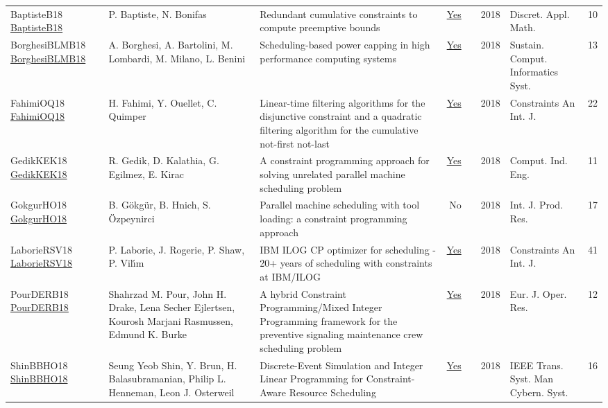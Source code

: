 {\begin{longtable}{p{3cm}p{6cm}p{7cm}rrrp{3cm}r}
BaptisteB18 \href{https://doi.org/10.1016/j.dam.2017.05.001}{BaptisteB18} & P. Baptiste, N. Bonifas & Redundant cumulative constraints to compute preemptive bounds & \href{articles/BaptisteB18.pdf}{Yes} & \cite{BaptisteB18} & 2018 & Discret. Appl. Math. & 10\\
BorghesiBLMB18 \href{https://doi.org/10.1016/j.suscom.2018.05.007}{BorghesiBLMB18} & A. Borghesi, A. Bartolini, M. Lombardi, M. Milano, L. Benini & Scheduling-based power capping in high performance computing systems & \href{articles/BorghesiBLMB18.pdf}{Yes} & \cite{BorghesiBLMB18} & 2018 & Sustain. Comput. Informatics Syst. & 13\\
FahimiOQ18 \href{https://doi.org/10.1007/s10601-018-9282-9}{FahimiOQ18} & H. Fahimi, Y. Ouellet, C. Quimper & Linear-time filtering algorithms for the disjunctive constraint and a quadratic filtering algorithm for the cumulative not-first not-last & \href{articles/FahimiOQ18.pdf}{Yes} & \cite{FahimiOQ18} & 2018 & Constraints An Int. J. & 22\\
GedikKEK18 \href{https://doi.org/10.1016/j.cie.2018.05.014}{GedikKEK18} & R. Gedik, D. Kalathia, G. Egilmez, E. Kirac & A constraint programming approach for solving unrelated parallel machine scheduling problem & \href{articles/GedikKEK18.pdf}{Yes} & \cite{GedikKEK18} & 2018 & Comput. Ind. Eng. & 11\\
GokgurHO18 \href{https://doi.org/10.1080/00207543.2017.1421781}{GokgurHO18} & B. G{\"{o}}kg{\"{u}}r, B. Hnich, S. {\"{O}}zpeynirci & Parallel machine scheduling with tool loading: a constraint programming approach & No & \cite{GokgurHO18} & 2018 & Int. J. Prod. Res. & 17\\
LaborieRSV18 \href{https://doi.org/10.1007/s10601-018-9281-x}{LaborieRSV18} & P. Laborie, J. Rogerie, P. Shaw, P. Vil{\'{\i}}m & {IBM} {ILOG} {CP} optimizer for scheduling - 20+ years of scheduling with constraints at {IBM/ILOG} & \href{articles/LaborieRSV18.pdf}{Yes} & \cite{LaborieRSV18} & 2018 & Constraints An Int. J. & 41\\
PourDERB18 \href{https://doi.org/10.1016/j.ejor.2017.08.033}{PourDERB18} & Shahrzad M. Pour, John H. Drake, Lena Secher Ejlertsen, Kourosh Marjani Rasmussen, Edmund K. Burke & A hybrid Constraint Programming/Mixed Integer Programming framework for the preventive signaling maintenance crew scheduling problem & \href{articles/PourDERB18.pdf}{Yes} & \cite{PourDERB18} & 2018 & Eur. J. Oper. Res. & 12\\
ShinBBHO18 \href{https://doi.org/10.1109/TSMC.2017.2681623}{ShinBBHO18} & Seung Yeob Shin, Y. Brun, H. Balasubramanian, Philip L. Henneman, Leon J. Osterweil & Discrete-Event Simulation and Integer Linear Programming for Constraint-Aware Resource Scheduling & \href{articles/ShinBBHO18.pdf}{Yes} & \cite{ShinBBHO18} & 2018 & {IEEE} Trans. Syst. Man Cybern. Syst. & 16\\

\end{longtable}}
